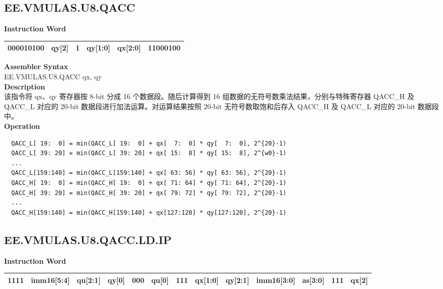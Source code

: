 \clearpage
\subsection{EE.VMULAS.U8.QACC}\label{instruction:EEVMULASU8QACC}
\setlength\tabcolsep{6pt}
\textbf{Instruction Word} \\
\begin{tabular}{|c|c|c|c|c|c|}
	\hline
	000010100 & qy[2] & 1 & qy[1:0] & qx[2:0] & 11000100 \\
	\hline
\end{tabular}

\textbf{Assembler Syntax} \\
EE.VMULAS.U8.QACC qx, qy \\
\textbf{Description} \\
该指令将 qx、qy 寄存器按 8-bit 分成 16 个数据段。随后计算得到 16 组数据的无符号数乘法结果，分别与特殊寄存器 QACC\_H 及 QACC\_L 对应的 20-bit 数据段进行加法运算。对运算结果按照 20-bit 无符号数取饱和后存入 QACC\_H 及 QACC\_L 对应的 20-bit 数据段中。\\
\textbf{Operation}
\begin{lstlisting}
  QACC_L[ 19:  0] = min(QACC_L[ 19:  0] + qx[  7:  0] * qy[  7:  0], 2^{20}-1)
  QACC_L[ 39: 20] = min(QACC_L[ 39: 20] + qx[ 15:  8] * qy[ 15:  8], 2^{w0}-1)
  ...
  QACC_L[159:140] = min(QACC_L[159:140] + qx[ 63: 56] * qy[ 63: 56], 2^{20}-1)
  QACC_H[ 19:  0] = min(QACC_H[ 19:  0] + qx[ 71: 64] * qy[ 71: 64], 2^{20}-1)
  QACC_H[ 39: 20] = min(QACC_H[ 39: 20] + qx[ 79: 72] * qy[ 79: 72], 2^{20}-1)
  ...
  QACC_H[159:140] = min(QACC_H[159:140] + qx[127:120] * qy[127:120], 2^{20}-1)
\end{lstlisting}

\clearpage
\subsection{EE.VMULAS.U8.QACC.LD.IP}\label{instruction:EEVMULASU8QACCLDIP}
\setlength\tabcolsep{6pt}
\textbf{Instruction Word} \\
\begin{tabular}{|c|c|c|c|c|c|c|c|c|c|c|c|c|}
	\hline
	1111 & imm16[5:4] & qu[2:1] & qy[0] & 000 & qu[0] & 111 & qx[1:0] & qy[2:1] & imm16[3:0] & as[3:0] & 111 & qx[2] \\
	\hline
\end{tabular}

